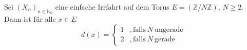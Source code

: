 Sei $(X_{n})_{n \in \mathbb{N}_{0}}$ eine einfache Irrfahrt auf dem Torus $E=(\mathbb{Z} / N \mathbb{Z})$, $N \geq 2$.
\\
Dann ist für alle $x \in E$
\begin{equation*}
d(x) =
\begin{cases}
1 & , \mathrm{falls} \: N \: \mathrm{ungerade}\\
2 & , \mathrm{ falls }\: N \: \mathrm{gerade}
\end{cases}
\end{equation*}